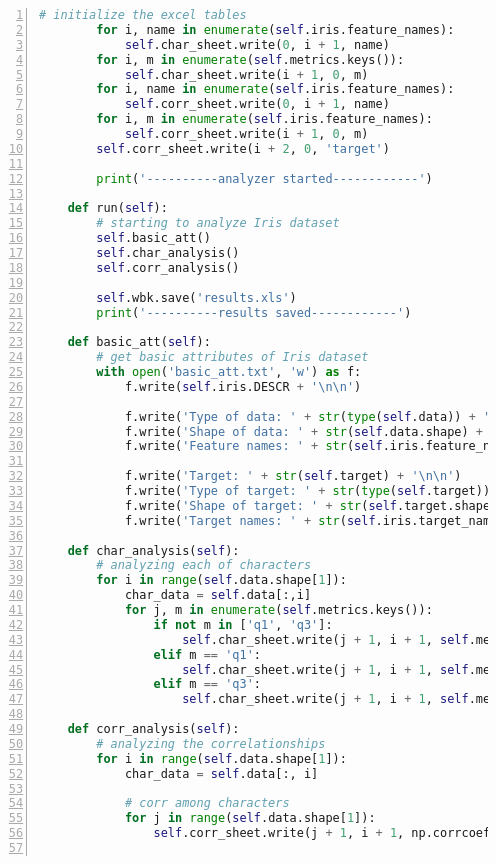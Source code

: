 \documentclass[12pt,a4paper]{article}
\theoremstyle{definition}
\begin{document}
\begin{appendix}
\begin{lstlisting}[language=Python,
		numbers=left,
		keywordstyle=\color{blue!70},
		commentstyle=\color{green!99!blue!99},
		frame=shadowbox,
		breaklines=True,
		title=Iris数据集探索代码]
        # initialize the excel tables
        for i, name in enumerate(self.iris.feature_names):
            self.char_sheet.write(0, i + 1, name)
        for i, m in enumerate(self.metrics.keys()):
            self.char_sheet.write(i + 1, 0, m)
        for i, name in enumerate(self.iris.feature_names):
            self.corr_sheet.write(0, i + 1, name)
        for i, m in enumerate(self.iris.feature_names):
            self.corr_sheet.write(i + 1, 0, m)
        self.corr_sheet.write(i + 2, 0, 'target')

        print('----------analyzer started------------')

    def run(self):
        # starting to analyze Iris dataset
        self.basic_att()
        self.char_analysis()
        self.corr_analysis()

        self.wbk.save('results.xls')
        print('----------results saved------------')

    def basic_att(self):
        # get basic attributes of Iris dataset
        with open('basic_att.txt', 'w') as f:
            f.write(self.iris.DESCR + '\n\n')

            f.write('Type of data: ' + str(type(self.data)) + '\n\n')
            f.write('Shape of data: ' + str(self.data.shape) + '\n\n')
            f.write('Feature names: ' + str(self.iris.feature_names) + '\n\n')

            f.write('Target: ' + str(self.target) + '\n\n')
            f.write('Type of target: ' + str(type(self.target)) + '\n\n')
            f.write('Shape of target: ' + str(self.target.shape) + '\n\n')
            f.write('Target names: ' + str(self.iris.target_names) + '\n\n')

    def char_analysis(self):
        # analyzing each of characters
        for i in range(self.data.shape[1]):
            char_data = self.data[:,i]
            for j, m in enumerate(self.metrics.keys()):
                if not m in ['q1', 'q3']:
                    self.char_sheet.write(j + 1, i + 1, self.metrics[m](char_data))
                elif m == 'q1':
                    self.char_sheet.write(j + 1, i + 1, self.metrics[m](char_data, p=0.25))
                elif m == 'q3':
                    self.char_sheet.write(j + 1, i + 1, self.metrics[m](char_data, p=0.75))

    def corr_analysis(self):
        # analyzing the correlationships
        for i in range(self.data.shape[1]):
            char_data = self.data[:, i]

            # corr among characters
            for j in range(self.data.shape[1]):
                self.corr_sheet.write(j + 1, i + 1, np.corrcoef(char_data, self.data[:, j])[0][1])


\end{lstlisting}
\end{appendix}
\end{document}
